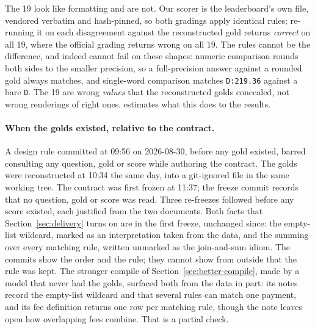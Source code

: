 The 19 look like formatting and are not. Our scorer is the leaderboard's own
file, vendored verbatim and hash-pinned, so both gradings apply identical
rules; re-running it on each disagreement against the reconstructed gold
returns \emph{correct} on all 19, where the official grading returns wrong
on all 19. The rules cannot be the difference, and indeed cannot fail on
these shapes: numeric comparison rounds both sides to the smaller precision,
so a full-precision answer against a rounded gold always matches, and
single-word comparison matches \texttt{D:219.36} against a bare \texttt{D}.
The 19 are wrong \emph{values} that the reconstructed golds concealed, not
wrong renderings of right ones.  estimates what this
does to the results.

\paragraph{When the golds existed, relative to the contract.} A design
rule committed at 09:56 on 2026-08-30, before any gold existed, barred
consulting any question, gold or score while authoring the contract. The
golds were reconstructed at 10:34 the same day, into a git-ignored file in
the same working tree. The contract was first frozen at 11:37; the freeze
commit records that no question, gold or score was read. Three re-freezes
followed before any score existed, each justified from the two documents.
Both facts that Section~\ref{sec:delivery} turns on are in the first
freeze, unchanged since: the empty-list wildcard, marked as an
interpretation taken from the data, and the summing over every matching
rule, written unmarked as the join-and-sum idiom. The commits show the
order and the rule; they cannot show from outside that the rule was kept.
The stronger compile of Section~\ref{sec:better-compile}, made by a model
that never had the golds, surfaced both from the data in part: its notes
record the empty-list wildcard and that several rules can match one
payment, and its fee definition returns one row per matching rule, though
the note leaves open how overlapping fees combine. That is a partial
check.

